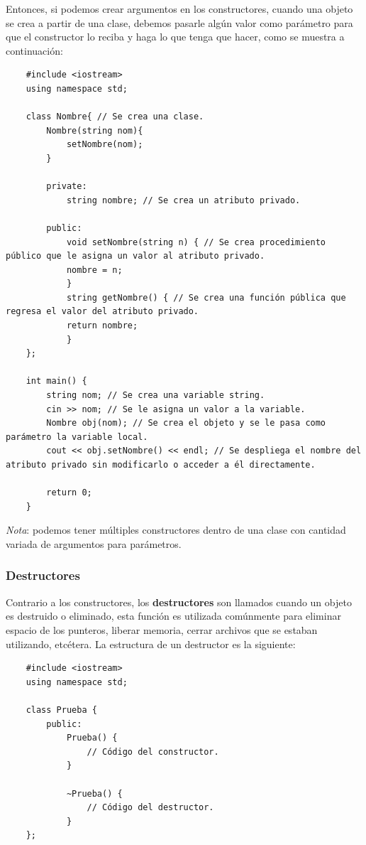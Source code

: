 Entonces, si podemos crear argumentos en los constructores, cuando una objeto se crea a partir de una clase, debemos pasarle algún valor como parámetro para que el constructor lo reciba y haga lo que tenga que hacer, como se muestra a continuación:
\begin{lstlisting}
    #include <iostream>
    using namespace std;

    class Nombre{ // Se crea una clase.
        Nombre(string nom){
            setNombre(nom);
        }
        
        private:
            string nombre; // Se crea un atributo privado.
        
        public:
            void setNombre(string n) { // Se crea procedimiento público que le asigna un valor al atributo privado.
            nombre = n;
            }
            string getNombre() { // Se crea una función pública que regresa el valor del atributo privado.
            return nombre;
            }
    };
    
    int main() {
        string nom; // Se crea una variable string.
        cin >> nom; // Se le asigna un valor a la variable.
        Nombre obj(nom); // Se crea el objeto y se le pasa como parámetro la variable local.
        cout << obj.setNombre() << endl; // Se despliega el nombre del atributo privado sin modificarlo o acceder a él directamente.
        
        return 0;
    }
\end{lstlisting}

\textit{Nota}: podemos tener múltiples constructores dentro de una clase con cantidad variada de argumentos para parámetros.


\subsubsection{Destructores}
\hspace{0.55cm}Contrario a los constructores, los \textbf{destructores} son llamados cuando un objeto es destruido o eliminado, esta función es utilizada comúnmente para eliminar espacio de los punteros, liberar memoria, cerrar archivos que se estaban utilizando, etcétera. La estructura de un destructor es la siguiente:
\begin{lstlisting}
    #include <iostream>
    using namespace std;

    class Prueba {
        public:
            Prueba() {
                // Código del constructor.
            }
            
            ~Prueba() {
                // Código del destructor.
            }
    };
\end{lstlisting}

